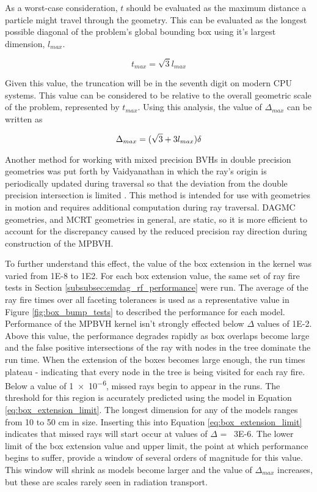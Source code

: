 As a worst-case consideration, $t$ should be evaluated as the maximum distance a
particle might travel through the geometry. This can be evaluated as the longest
possible diagonal of the problem's global bounding box using it's largest
dimension, $l_{max}$.

\begin{equation}
  t_{max} = \sqrt{3} l_{max}
\end{equation}

Given this value, the truncation will be in the seventh digit on modern
CPU systems. This value can be considered to be relative to the overall
geometric scale of the problem, represented by $t_{max}$. Using this analysis,
the value of $\Delta_{max}$ can be written as 

\begin{equation}
  \centering
  \Delta_{max} = (\sqrt{3} + 3 l_{max}) \delta
  \label{eq:box_extension_limit}
\end{equation}

Another method for working with mixed precision BVHs in double precision
geometries was put forth by Vaidyanathan in which the ray's origin is
periodically updated during traversal so that the deviation from the double
precision intersection is limited \cite{Vaidyanathan_2016}. This method is
intended for use with geometries in motion and requires additional computation
during ray traversal. DAGMC geometries, and MCRT geometries in
general, are static, so it is more efficient to account for the 
discrepancy caused by the reduced precision ray direction during
construction of 
the MPBVH.

To further understand this effect, the value of the box extension in the kernel
was varied from \num{1E-8} to \num{1E2}. For each box extension value, the same
set of ray fire tests in Section \ref{subsubsec:emdag_rf_performance} were
run. The average of the ray fire times over all faceting tolerances is used as a
representative value in Figure \ref{fig:box_bump_tests} to described the
performance for each model. Performance of the MPBVH kernel isn't strongly
effected below $\Delta$ values of \num{1E-2}. Above this value, the performance
degrades rapidly as box overlaps become large and the false positive
intersections of the ray with nodes in the tree dominate the run time. When the
extension of the boxes becomes large enough, the run times plateau - indicating
that every node in the tree is being visited for each ray fire. Below a value of
\num{1e-6}, missed rays begin to appear in the runs. The threshold for this
region is accurately predicted using the model in Equation
\eqref{eq:box_extension_limit}. The longest dimension for any of the models ranges
from 10 to 50 cm in size. Inserting this into Equation
\eqref{eq:box_extension_limit} indicates that missed rays will start occur at
values of $\Delta$ = ~\num{3E-6}. The lower limit of the box extension value and
upper limit, the point at which performance begins to suffer, provide a window
of several orders of magnitude for this value. This window will shrink as models
become larger and the value of $\Delta_{max}$ increases, but these are scales
rarely seen in radiation transport.

